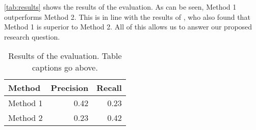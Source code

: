 \lipsum[2-4]

\autoref{tab:results} shows the results of the evaluation.
As can be seen, Method 1 outperforms Method 2.
This is in line with the results of \citet{phdthesis-kinder}, who also found that Method 1 is superior to Method 2.
All of this allows us to answer our proposed research question.

\begin{table}[t]
    \centering
    \caption{Results of the evaluation. Table captions go above.}
    \label{tab:results}
    \begin{tabularx}{.7\linewidth}{Xrr}
        \toprule
        \textbf{Method} & \textbf{Precision} & \textbf{Recall} \\
        \midrule
        Method 1 & 0.42 & 0.23 \\
        Method 2 & 0.23 & 0.42 \\
        \bottomrule
    \end{tabularx}
\end{table}

\lipsum[2-4]
